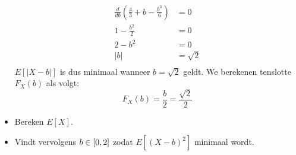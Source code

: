 \documentclass[main.tex]{subfiles}
\begin{document}
\begin{oef}
\begin{itemize}
\[\begin{array}{rl}
    \end{array}
    \]
    \[
    \begin{array}{cc}
      \frac{d}{db}\left(\frac{4}{3} + b - \frac{b^{3}}{6}\right) &= 0\\
      1 - \frac{b^{2}}{2} &= 0\\
      2 - b^{2} &= 0\\
      |b| &= \sqrt{2}\\
    \end{array}
    \]
    $E[|X-b|]$ is dus minimaal wanneer $b=\sqrt{2}$ geldt.
    We berekenen tenslotte $F_{X}(b)$ als volgt:
    \[ F_{X}(b) = \frac{b}{2} =\frac{\sqrt{2}}{2} \]
  \item Bereken $E[X]$.
  \item Vindt vervolgens $b \in \interval{0}{2}$ zodat $E[(X-b)^{2}]$ minimaal wordt.
  \end{itemize}
\end{oef}
\end{document}
